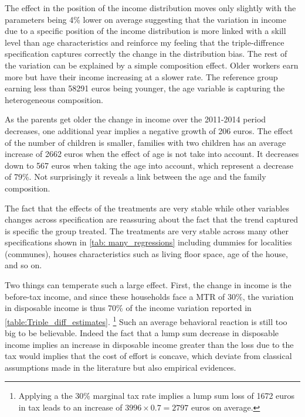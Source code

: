  The effect in the position of the income distribution moves only slightly with the parameters being 4\% lower on average suggesting that the variation in income due to a specific position of the income distribution is more linked with a skill level than age characteristics and reinforce my feeling that the triple-diffrence specification captures correctly the change in the distribution bias. The rest of the variation can be explained by a simple composition effect. Older workers earn more but have their income increasing at a slower rate. The reference group earning less than 58291 euros being younger, the age variable is capturing the heterogeneous composition.

 As the parents get older the change in income over the 2011-2014 period decreases, one additional year implies a negative growth of 206 euros.  The  effect of the number of children is smaller, families with two children has an average increase of 2662 euros when the effect of age is not take into account. It decreases down to 567 euros when taking the age into account, which represent a decrease of 79\%. Not surprisingly it reveals a link between the age and the family composition. 

 The fact that the effects of the treatments are very stable while other variables changes across specification are reassuring about the fact that the trend captured is specific the group treated. The treatments are very stable across many other specifications shown in \autoref{tab: many_regressions} including dummies for localities (communes), houses characteristics such as living floor space, age of the house, and so on. 
 

 



\medskip



Two things can temperate such a large effect. First, the change in income is the before-tax income, and since these households face a MTR of 30\%,  the variation in disposable income is thus 70\% of the income variation reported in \autoref{table:Triple_diff_estimates}.
\footnote{Applying a the 30\% marginal tax rate implies  a lump sum loss of 1672 euros in tax leads to an increase of $3996 \times 0.7 = 2 797$ euros on average.}
 Such an average behavioral reaction is still too big to be believable. Indeed the fact that a lump sum decrease in disposable income implies an increase in disposable income greater than the loss due to the tax would implies that the cost of effort is concave, which deviate from classical assumptions made in the literature but also empirical evidences.
 
